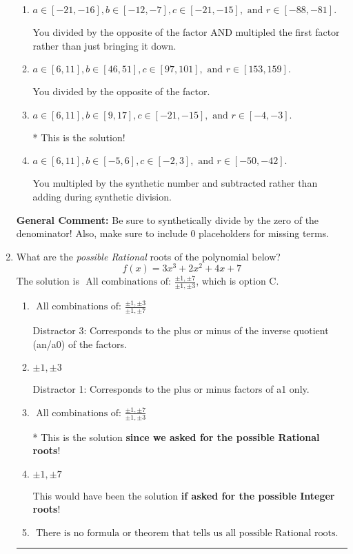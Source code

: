 \documentclass{extbook}[14pt]
\newcommand{\litem}[1]{\item #1

\rule{\textwidth}{0.4pt}}
\begin{document}
\begin{enumerate}
{\begin{enumerate}[label=\Alph*.]
 You multipled by the synthetic number rather than bringing the first factor down.
\item \( a \in [-21, -16], b \in [-12, -7], c \in [-21, -15], \text{ and } r \in [-88, -81]. \)

 You divided by the opposite of the factor AND multipled the first factor rather than just bringing it down.
\item \( a \in [6, 11], b \in [46, 51], c \in [97, 101], \text{ and } r \in [153, 159]. \)

 You divided by the opposite of the factor.
\item \( a \in [6, 11], b \in [9, 17], c \in [-21, -15], \text{ and } r \in [-4, -3]. \)

* This is the solution!
\item \( a \in [6, 11], b \in [-5, 6], c \in [-2, 3], \text{ and } r \in [-50, -42]. \)

 You multipled by the synthetic number and subtracted rather than adding during synthetic division.
\end{enumerate}

\textbf{General Comment:} Be sure to synthetically divide by the zero of the denominator! Also, make sure to include 0 placeholders for missing terms.
}
\litem{
What are the \textit{possible Rational} roots of the polynomial below?
\[ f(x) = 3x^{3} +2 x^{2} +4 x + 7 \]The solution is \( \text{ All combinations of: }\frac{\pm 1,\pm 7}{\pm 1,\pm 3} \), which is option C.\begin{enumerate}[label=\Alph*.]
\item \( \text{ All combinations of: }\frac{\pm 1,\pm 3}{\pm 1,\pm 7} \)

 Distractor 3: Corresponds to the plus or minus of the inverse quotient (an/a0) of the factors. 
\item \( \pm 1,\pm 3 \)

 Distractor 1: Corresponds to the plus or minus factors of a1 only.
\item \( \text{ All combinations of: }\frac{\pm 1,\pm 7}{\pm 1,\pm 3} \)

* This is the solution \textbf{since we asked for the possible Rational roots}!
\item \( \pm 1,\pm 7 \)

This would have been the solution \textbf{if asked for the possible Integer roots}!
\item \( \text{ There is no formula or theorem that tells us all possible Rational roots.} \)


\end{enumerate}}
\end{enumerate}
\end{document}
